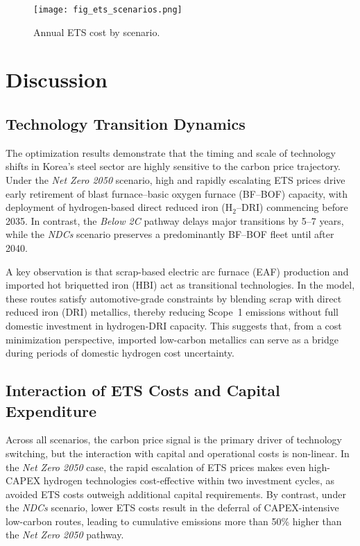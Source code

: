 \documentclass[preprint,5p,authoryear]{elsarticle}
\begin{document}
\begin{figure}[!t]
  \centering
  \texttt{[image: fig\_ets\_scenarios.png]}
  \caption{Annual ETS cost by scenario.}
  \label{fig:ets-scenarios}
\end{figure}


\section{Discussion}

\subsection{Technology Transition Dynamics}
The optimization results demonstrate that the timing and scale of technology shifts in Korea's steel sector are highly sensitive to the carbon price trajectory. Under the \textit{Net Zero 2050} scenario, high and rapidly escalating ETS prices drive early retirement of blast furnace–basic oxygen furnace (BF--BOF) capacity, with deployment of hydrogen-based direct reduced iron (H$_2$--DRI) commencing before 2035. In contrast, the \textit{Below 2\textdegree C} pathway delays major transitions by 5--7 years, while the \textit{NDCs} scenario preserves a predominantly BF--BOF fleet until after 2040.

A key observation is that scrap-based electric arc furnace (EAF) production and imported hot briquetted iron (HBI) act as transitional technologies. In the model, these routes satisfy automotive-grade constraints by blending scrap with direct reduced iron (DRI) metallics, thereby reducing Scope~1 emissions without full domestic investment in hydrogen-DRI capacity. This suggests that, from a cost minimization perspective, imported low-carbon metallics can serve as a bridge during periods of domestic hydrogen cost uncertainty.

\subsection{Interaction of ETS Costs and Capital Expenditure}
Across all scenarios, the carbon price signal is the primary driver of technology switching, but the interaction with capital and operational costs is non-linear. In the \textit{Net Zero 2050} case, the rapid escalation of ETS prices makes even high-CAPEX hydrogen technologies cost-effective within two investment cycles, as avoided ETS costs outweigh additional capital requirements. By contrast, under the \textit{NDCs} scenario, lower ETS costs result in the deferral of CAPEX-intensive low-carbon routes, leading to cumulative emissions more than 50\% higher than the \textit{Net Zero 2050} pathway.
\end{document}

